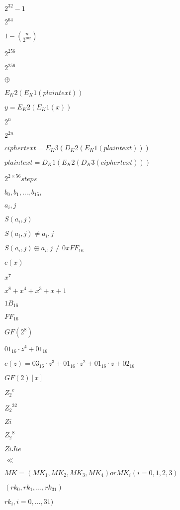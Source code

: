 \documentclass{article}
\begin{document}
${2}^{32}-1$
\pagebreak

${2}^{64}$
\pagebreak

$1-(\frac{n}{{2}^{102}})$
\pagebreak

${2}^{256}$
\pagebreak

$2^256$
\pagebreak

$ \oplus $
\pagebreak

$ E_K2(E_K1(plaintext)) $
\pagebreak

$ y = E_K2(E_K1(x))$
\pagebreak

$ {2}^{n}$
\pagebreak

$ {2}^{2n}$
\pagebreak

$ ciphertext = E_K3 (D_K2(E_K1(plaintext)))$
\pagebreak

$ plaintext = D_K1(E_K2(D_K3(ciphertext)))$
\pagebreak

$ {2}^{2 × 56} steps$
\pagebreak

$ b_0, b_1,...,b_15,$
\pagebreak

$ a_i,j $
\pagebreak

$ S(a_i,j) $
\pagebreak

$ S(a_i,j) ≠ a_i,j $
\pagebreak

$ S(a_i,j) \oplus a_i,j ≠ 0xFF_16 $
\pagebreak

$ c(x)$
\pagebreak

$ {x}^{7} $
\pagebreak

$ {x}^{8}+{x}^{4}+{x}^{3}+x+1 $
\pagebreak

$ 1B_16 $
\pagebreak

$ FF_16 $
\pagebreak

$ GF({2}^{8}) $
\pagebreak

$ 01_16 \cdot {z}^{4} + 01_16 $
\pagebreak

$ c(z) = 03_16 \cdot {z}^{3} + 01_16 \cdot {z}^{2} + 01_16 \cdot z + 02_16 $
\pagebreak

$ GF(2)[x] $
\pagebreak

${Z_2}^{e}$
\pagebreak

${Z_2}^{32}$
\pagebreak

$ Zi$
\pagebreak

${Z_2}^{8}$
\pagebreak

$ ZiJie$
\pagebreak

$ \ll$
\pagebreak

$ MK = (MK_1,MK_2,MK_3,MK_4) or MK_i(i = 0, 1, 2, 3)$
\pagebreak

$ (rk_0, rk_1,...,rk_{31})$
\pagebreak

$ rk_i, i=0,...,31)$
\pagebreak
\end{document}
